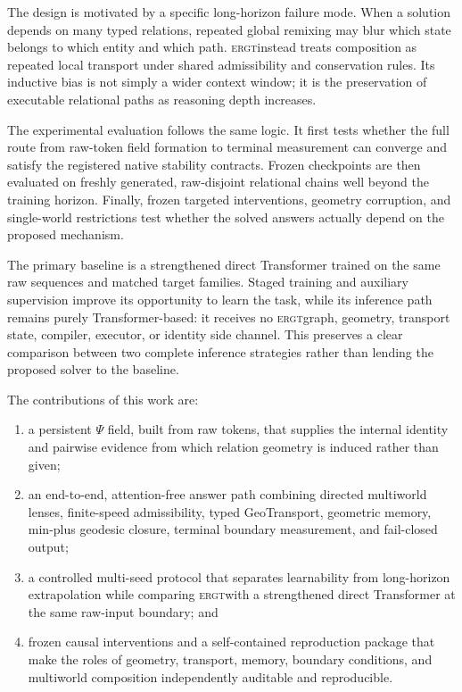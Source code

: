 \documentclass[11pt]{article}
\newcommand{\ERGT}{\textsc{ergt}}
\begin{document}
The design is motivated by a specific long-horizon failure mode. When a
solution depends on many typed relations, repeated global remixing may blur
which state belongs to which entity and which path. \ERGT instead treats
composition as repeated local transport under shared admissibility and
conservation rules. Its inductive bias is not simply a wider context window;
it is the preservation of executable relational paths as reasoning depth
increases.

The experimental evaluation follows the same logic. It first tests whether the
full route from raw-token field formation to terminal measurement can converge
and satisfy the registered native stability contracts. Frozen checkpoints are
then evaluated on freshly generated, raw-disjoint relational chains well
beyond the training horizon. Finally, frozen targeted interventions, geometry
corruption, and single-world restrictions test whether the solved answers
actually depend on the proposed mechanism.

The primary baseline is a strengthened direct Transformer trained on the same
raw sequences and matched target families. Staged training and auxiliary
supervision improve its opportunity to learn the task, while its inference
path remains purely Transformer-based: it receives no \ERGT graph, geometry,
transport state, compiler, executor, or identity side channel. This preserves a
clear comparison between two complete inference strategies rather than lending
the proposed solver to the baseline.

The contributions of this work are:
\begin{enumerate}
  \item a persistent $\Psi$ field, built from raw tokens, that supplies the
  internal identity and pairwise evidence from which relation geometry is
  induced rather than given;
  \item an end-to-end, attention-free answer path combining directed
  multiworld lenses, finite-speed admissibility, typed GeoTransport, geometric
  memory, min-plus geodesic closure, terminal boundary measurement, and
  fail-closed output;
  \item a controlled multi-seed protocol that separates learnability from
  long-horizon extrapolation while comparing \ERGT with a strengthened direct
  Transformer at the same raw-input boundary; and
  \item frozen causal interventions and a self-contained reproduction package
  that make the roles of geometry, transport, memory, boundary conditions, and
  multiworld composition independently auditable and reproducible.
\end{enumerate}
\end{document}
